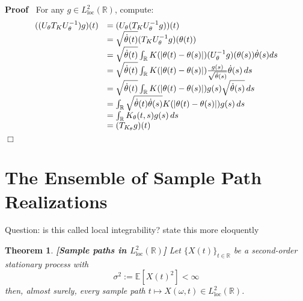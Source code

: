 \documentclass{article}
\newcommand{\assign}{:=}
\newcommand{\tmop}[1]{\ensuremath{\operatorname{#1}}}
\newcommand{\tmstrong}[1]{\textbf{#1}}
\newenvironment{proof}{\noindent\textbf{Proof\ }}{\hspace*{\fill}$\Box$\medskip}
\newtheorem{theorem}{Theorem}
\begin{document}
\begin{proof}
  For any $g \in L^2_{\tmop{loc}} (\mathbb{R})$, compute:
  \begin{equation}
    \begin{array}{ll}
      ((U_{\theta} T_K U_{\theta}^{- 1}) g) (t) & = (U_{\theta} (T_K
      U_{\theta}^{- 1} g)) (t)\\
      & = \sqrt{\dot{\theta} (t)}  (T_K U_{\theta}^{- 1} g) (\theta (t))\\
      & = \sqrt{\dot{\theta} (t)}  \int_{\mathbb{R}} K (| \theta (t) - \theta
      (s) |)  (U_{\theta}^{- 1} g) (\theta (s)) \dot{\theta} (s) d s\\
      & = \sqrt{\dot{\theta} (t)}  \int_{\mathbb{R}} K (| \theta (t) - \theta
      (s) |) \frac{g (s)}{\sqrt{\dot{\theta} (s)}}  \dot{\theta} (s) 
      \hspace{0.17em} ds\\
      & = \sqrt{\dot{\theta} (t)}  \int_{\mathbb{R}} K (| \theta (t) - \theta
      (s) |) g (s) \sqrt{\dot{\theta} (s)}  \hspace{0.17em} ds\\
      & = \int_{\mathbb{R}} \sqrt{\dot{\theta} (t) \dot{\theta} (s)} K (|
      \theta (t) - \theta (s) |) g (s)  \hspace{0.17em} ds\\
      & = \int_{\mathbb{R}} K_{\theta} (t, s) g (s)  \hspace{0.17em} ds\\
      & = (T_{K_{\theta}} g) (t)
    \end{array}
  \end{equation}
\end{proof}

\section{The Ensemble of Sample Path Realizations}\label{sec:samplepaths}

Question: is this called local integrability? state this more eloquently

\begin{theorem}
  {\tmstrong{[Sample paths in $L^2_{\tmop{loc}}
  (\mathbb{R})$]\label{thm:paths_loc}}} Let $\{X (t)\}_{t \in \mathbb{R}}$ be
  a second-order stationary process with
  \begin{equation}
    \sigma^2 \assign \mathbb{E} [X (t)^2] < \infty
  \end{equation}
  then, almost surely, every sample path $t \mapsto X (\omega, t) \in
  L^2_{\tmop{loc}} (\mathbb{R})$.
\end{theorem}
\end{document}

